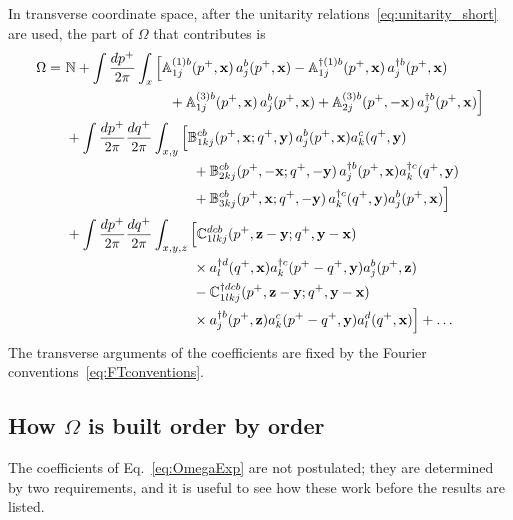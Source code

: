 In transverse coordinate space, after the unitarity relations~\eqref{eq:unitarity_short} are used, the part of $\Omega$ that contributes is
\begin{align}\label{eq:OmegaX}
\Omega = \ &\mf N
+\int\frac{dp^+}{2\pi}\int_x\Big[\mf A^{(1)b}_{1j}(p^+,\v x)\,a^b_j(p^+,\v x)-\mf A^{\dagger(1)b}_{1j}(p^+,\v x)\,a^{\dagger b}_j(p^+,\v x)
\notag\\&\hspace{2.6cm}
+\mf A^{(3)b}_{1j}(p^+,\v x)\,a^b_j(p^+,\v x)+\mf A^{(3)b}_{2j}(p^+,-\v x)\,a^{\dagger b}_j(p^+,\v x)\Big]
\notag\\&
+\int\frac{dp^+}{2\pi}\frac{dq^+}{2\pi}\int_{x,y}\Big[\mf B^{cb}_{1kj}(p^+,\v x;q^+,\v y)\,a^b_j(p^+,\v x)a^c_k(q^+,\v y)
\notag\\&\hspace{3.2cm}
+\mf B^{cb}_{2kj}(p^+,-\v x;q^+,-\v y)\,a^{\dagger b}_j(p^+,\v x)a^{\dagger c}_k(q^+,\v y)
\notag\\&\hspace{3.2cm}
+\mf B^{cb}_{3kj}(p^+,\v x;q^+,-\v y)\,a^{\dagger c}_k(q^+,\v y)a^b_j(p^+,\v x)\Big]
\notag\\&
+\int\frac{dp^+}{2\pi}\frac{dq^+}{2\pi}\int_{x,y,z}\Big[\mf C^{dcb}_{1lkj}(p^+,\v z-\v y;q^+,\v y-\v x)
\notag\\&\hspace{3.2cm}\times a^{\dagger d}_l(q^+,\v x)a^{\dagger c}_k(p^+-q^+,\v y)a^b_j(p^+,\v z)
\notag\\&\hspace{3.2cm}
-\mf C^{\dagger dcb}_{1lkj}(p^+,\v z-\v y;q^+,\v y-\v x)
\notag\\&\hspace{3.2cm}\times a^{\dagger b}_j(p^+,\v z)a^c_k(p^+-q^+,\v y)a^d_l(q^+,\v x)\Big]+\dots
\end{align}
The transverse arguments of the coefficients are fixed by the Fourier conventions~\eqref{eq:FTconventions}.

\subsection{How \texorpdfstring{$\Omega$}{Omega} is built order by order}\label{sec:construction}

The coefficients of Eq.~\eqref{eq:OmegaExp} are not postulated; they are determined by two requirements, and it is useful to see how these work before the results are listed.

